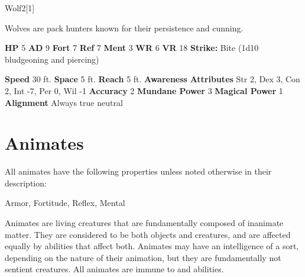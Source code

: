   
  \begin{monsection}{Wolf}{2}[1]
    \vspace{-1em}\vspace{-1em}
    \vspace{0em}

    
        Wolves are pack hunters known for their persistence and cunning.
      

    \begin{spellcontent}
      \begin{spelltargetinginfo}
        \pari \textbf{HP} 5 \monsep
          \textbf{AD} 9 \monsep
          \textbf{Fort} 7 \monsep
          \textbf{Ref} 7 \monsep
          \textbf{Ment} 3
        \pari \textbf{WR} 6 \monsep
        \textbf{VR} 18
        \pari \textbf{Strike:}
            Bite  (1d10 bludgeoning and piercing)
      \end{spelltargetinginfo}
    \end{spellcontent}
    \begin{monsterfooter}
      \pari \textbf{Speed} 30 ft. \monsep
        \textbf{Space} 5 ft. \monsep
        \textbf{Reach} 5 ft.
      \pari \textbf{Awareness} 
      \pari \textbf{Attributes}
        Str 2, Dex 3,
        Con 2, Int -7,
        Per 0, Wil -1
      \pari \textbf{Accuracy} 2 \monsep
        \textbf{Mundane Power} 3 \monsep
      \textbf{Magical Power} 1
      \pari \textbf{Alignment} Always true neutral
    \end{monsterfooter}
  \end{monsection}
  
  
        \newpage
        \section{Animates}

        All animates have the following properties unless noted otherwise in their description:
        
    
     Armor,
     Fortitude,
     Reflex,
     Mental
  
     Animates are living creatures that are fundamentally composed of inanimate matter.
    They are considered to be both objects and creatures, and are affected equally by abilities that affect both.
     Animates may have an intelligence of a sort, depending on the nature of their animation, but they are fundamentally not sentient creatures.
    All animates are immune to  and  abilities.
  
